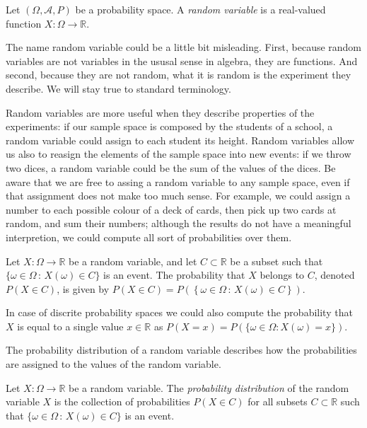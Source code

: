 \begin{definition}
Let $\left( \Omega, \mathcal{A} , P \right)$ be a probability space. A \emph{random variable} is a real-valued function $X : \Omega \rightarrow \mathbb{R}$.
\end{definition}

The name random variable could be a little bit misleading. First, because random variables are not variables in the ususal sense in algebra, they are functions. And second, because they are not random, what it is random is the experiment they describe. We will stay true to standard terminology.

Random variables are more useful when they describe properties of the experiments: if our sample space is composed by the students of a school, a random variable could assign to each student its height. Random variables allow us also to reasign the elements of the sample space into new events: if we throw two dices, a random variable could be the sum of the values of the dices. Be aware that we are free to assing a random variable to any sample space, even if that assignment does not make too much sense. For example, we could assign a number to each possible colour of a deck of cards, then pick up two cards at random, and sum their numbers; although the results do not have a meaningful interpretion, we could compute all sort of probabilities over them.

\begin{definition}
Let $X : \Omega \rightarrow \mathbb{R}$ be a random variable, and let $C \subset \mathbb{R}$ be a subset such that $\{ \omega \in \Omega \,:\, X \left( \omega \right) \in C\}$ is an event. The probability that $X$ belongs to $C$, denoted $P\left(X \in C \right)$, is given by $P\left( X \in C \right)=P \left( \left\{ \omega \in \Omega \,:\, X \left( \omega \right) \in C\right\} \right)$.
\end{definition}

In case of discrite probability spaces we could also compute the probability that $X$ is equal to a single value $x \in \mathbb{R}$ as $P(X = x) = P(\{ \omega \in \Omega : X(\omega) = x\})$.

The probability distribution of a random variable describes how the probabilities are assigned to the values of the random variable. 

\begin{definition}
Let $X : \Omega \rightarrow \mathbb{R}$ be a random variable. The \emph{probability distribution} of the random variable $X$ is the collection of probabilities $P\left( X \in C \right)$ for all subsets $C \subset \mathbb{R}$ such that $\{ \omega \in \Omega \,:\, X \left( \omega \right) \in C\}$ is an event.
\end{definition}

